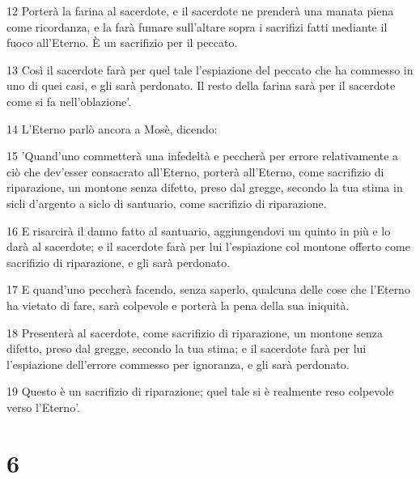 \par 12 Porterà la farina al sacerdote, e il sacerdote ne prenderà una manata piena come ricordanza, e la farà fumare sull'altare sopra i sacrifizi fatti mediante il fuoco all'Eterno. È un sacrifizio per il peccato.
\par 13 Così il sacerdote farà per quel tale l'espiazione del peccato che ha commesso in uno di quei casi, e gli sarà perdonato. Il resto della farina sarà per il sacerdote come si fa nell'oblazione'.
\par 14 L'Eterno parlò ancora a Mosè, dicendo:
\par 15 'Quand'uno commetterà una infedeltà e peccherà per errore relativamente a ciò che dev'esser consacrato all'Eterno, porterà all'Eterno, come sacrifizio di riparazione, un montone senza difetto, preso dal gregge, secondo la tua stima in sicli d'argento a siclo di santuario, come sacrifizio di riparazione.
\par 16 E risarcirà il danno fatto al santuario, aggiungendovi un quinto in più e lo darà al sacerdote; e il sacerdote farà per lui l'espiazione col montone offerto come sacrifizio di riparazione, e gli sarà perdonato.
\par 17 E quand'uno peccherà facendo, senza saperlo, qualcuna delle cose che l'Eterno ha vietato di fare, sarà colpevole e porterà la pena della sua iniquità.
\par 18 Presenterà al sacerdote, come sacrifizio di riparazione, un montone senza difetto, preso dal gregge, secondo la tua stima; e il sacerdote farà per lui l'espiazione dell'errore commesso per ignoranza, e gli sarà perdonato.
\par 19 Questo è un sacrifizio di riparazione; quel tale si è realmente reso colpevole verso l'Eterno'.

\chapter{6}

